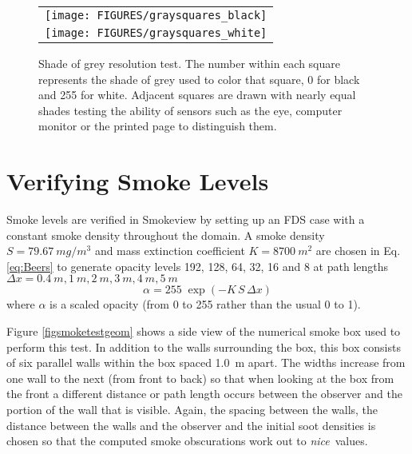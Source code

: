 \documentclass[11pt,twoside]{book}
\begin{document}
\begin{figure}[\figoptions]
\begin{center}
 \centering
\begin{tabular}{c}
\texttt{[image: FIGURES/graysquares\_black]}\\
\texttt{[image: FIGURES/graysquares\_white]}\\
 \end{tabular}
\end{center}
 \caption[Shade of grey resolution test.]{Shade of grey resolution test.  The number within each square represents the shade of grey used to color that square,  0 for black and 255 for white.  Adjacent squares are drawn with nearly equal shades  testing the ability of sensors such as the eye, computer monitor or the printed page  to distinguish them.
 }
\label{figgraysquare}%
\end{figure}

\section{Verifying Smoke Levels}
\label{sect:verify_smoke}

Smoke levels are verified in Smokeview by setting up an FDS case with a constant smoke density throughout the domain.  A smoke density $S=\SI{79.67}{mg/m^3}$ and mass extinction coefficient $K=\SI{8700}{m^2}$ are chosen in Eq. \ref{eq:Beers} to generate opacity levels 192, 128, 64, 32, 16 and 8 at path lengths $\Delta x = \SI{0.4}{m}, \SI{1}{m}, \SI{2}{m}, \SI{3}{m}, \SI{4}{m} , \SI{5}{m}$
\begin{equation}
\alpha = 255 \; \exp(-K \, S \, \Delta x)
\label{eq:Beers}
\end{equation}
where $\alpha$ is a scaled opacity (from 0 to 255 rather than the usual 0 to 1).

Figure \ref{figsmoketestgeom} shows a side view of the numerical smoke box used to perform this test.  In addition to the walls surrounding the box, this box consists of  six parallel walls within the box spaced 1.0~m apart.  The widths increase from one wall to the next (from front to back) so that when looking at the box from the front a different distance or path length occurs between the observer and the portion of the wall that is visible. Again, the spacing between the walls, the distance between the walls and the observer and the initial soot densities is chosen so that the computed smoke obscurations work out to {\em nice}\ values.
\end{document}
